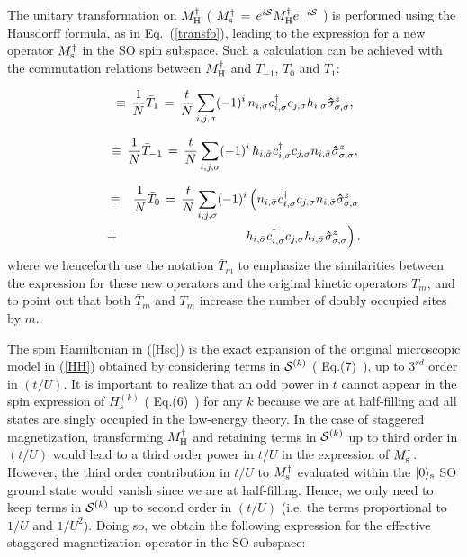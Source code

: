 \documentclass[aps,prb,twocolumn,superscriptaddress,
               amsmath]{revtex4}
\newcommand{\eqn}[1]{\vspace{-0.cm}\begin{equation}
#1
\end{equation}}
\renewcommand{\=}{\,=\,}
\newcommand{\+}{\,+\,}
\renewcommand{\-}{\,-\,}
\newcommand{\f}[2]{{\ensuremath{\mathchoice%
        {\dfrac{#1}{#2}}
        {\dfrac{#1}{#2}}
        {\frac{#1}{#2}}
        {\frac{#1}{#2}}
        }}}
\begin{document}
The unitary  transformation on $M^\dagger_{\rm H}$ ( $M_{\rm s}^{\dag}\,=\,e^{i{\cal S}} M_{\rm H}^{\dag} e^{-i{\cal S}}$ ) is
performed using the Hausdorff formula, as in Eq.~(\ref{transfo}), leading to the expression for a new operator  $M^\dagger_{\rm s}$ in the
SO spin subspace. Such a calculation can  be achieved with the commutation
relations between $M_{\rm H}^{\dag}$ and $T_{-1}$, $T_0$ and $T_1$:

\eqn{[T_1,M_{\rm H}^{\dag}]\,\equiv\,\f{1}{N}\bar{T}_1\,=\,
\f{t}{N} \sum_{i,j,\sigma} (-1)^i \, n_{i,\bar{\sigma}}
c_{i,\sigma}^{\dag} c_{j,\sigma} h_{i,\bar{\sigma}}
\mathbf{\hat{\sigma}}_{\sigma,\sigma}^z,\label{commut1}}


\eqn{[T_{-1},M_{\rm H}^{\dag} ]\,\equiv\,\f{1}{N}\bar{T}_{-1}\,=\,
\f{t}{N} \sum_{i,j,\sigma}(-1)^i\, h_{i,\bar{\sigma}} c_{i,\sigma}^{\dag} c_{j,\sigma}
n_{i,\bar{\sigma}} \mathbf{\hat{\sigma}}_{\sigma,\sigma}^z,\label{commut2}}

\begin{eqnarray}
[T_0,M_{\rm H}^{\dag}] & \equiv &\f{1}{N}\bar{T}_0\,=\,
\f{t}{N} \sum_{i,j,\sigma} (-1)^i\left(n_{i,\bar{\sigma}}
c_{i,\sigma}^{\dag} c_{j,\sigma} n_{i,\bar{\sigma}}
 \mathbf{\hat{\sigma}}_{\sigma,\sigma}^z \right. \nonumber\\
 & +& \left.  h_{i,\bar{\sigma}} c_{i,\sigma}^{\dag} c_{j,\sigma}
h_{i,\bar{\sigma}}  \mathbf{\hat{\sigma}}_{\sigma,\sigma}^z\right).
\label{commut3}
\end{eqnarray}
where we henceforth use the notation $\bar{T}_m$ to emphasize the
similarities between the expression for these new operators and the
original kinetic operators ${T}_m$, and to point out that both
$\bar{T}_m$ and ${T}_m$ increase the number of doubly
occupied sites by $m$.

The spin Hamiltonian in (\ref{Hso}) is the exact expansion of the original microscopic model in (\ref{HH}) obtained by considering terms in ${\cal S}^{(k)}$ ( Eq.(7)~), up to $3^{rd}$ order in $(t/U)$. It is important to realize that an odd power in $t$ cannot appear in the spin expression of $H_s^{(k)}$ ( Eq.(6)~) for any $k$ because we are at half-filling and all states are singly occupied in the low-energy theory. In the case of staggered magnetization, transforming $M_{\rm H}^\dagger$ and retaining terms in ${\cal S}^{(k)}$ up to third order in $(t/U)$ would lead to  a third order power in $t/U$ in the expression of $M_{\rm s}^\dagger$. However, the third order contribution in $t/U$ to $M_{\rm s}^\dagger$ evaluated within the $\vert 0\rangle_{\rm s}$ SO ground state would vanish since we are at half-filling. Hence, we only need to keep terms in ${\cal S}^{(k)}$ up to second order in $(t/U)$ (i.e. the terms proportional to $1/U$ and $1/U^2$). Doing so, we obtain the following expression for the effective staggered magnetization operator in the SO subspace:
\end{document}
